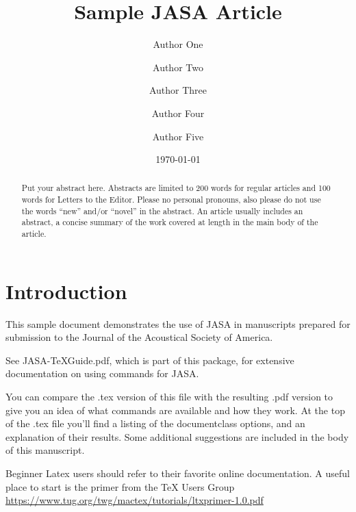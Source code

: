 \documentclass[reprint]{JASA}
\begin{document}
\title[JASA/Sample JASA Article]{Sample JASA Article}
\author{Author One}
\author{Author Two}
\author{Author Three}

\author{Author Four}
 
\author{Author Five}			


\date{\today} 

\begin{abstract}
Put your abstract here. Abstracts are limited to 200 words for
regular articles and 100 words for Letters to the Editor. Please no
personal pronouns, also please do not use the words ``new'' and/or
``novel'' in the abstract. An article usually includes an abstract, a
concise summary of the work covered at length in the main body of the
article.     
\end{abstract}


\maketitle


\section{\label{sec:1} Introduction}
This sample document demonstrates the use of JASA in manuscripts 
prepared for submission to the Journal of the Acoustical Society of America. 

See JASA-TeXGuide.pdf, which is part of this package, for extensive
documentation on using commands for JASA.

You can compare the .tex version of this file with the resulting .pdf
version to give you an idea of what  commands are available and how
they work. At the top of the .tex file you'll find a listing of the
documentclass options, and an explanation of their results.
Some additional suggestions are included in the body of this
manuscript.  

  Beginner Latex users should refer to their favorite online documentation. A 
  useful place to start is the primer from the TeX Users Group 
  \url{https://www.tug.org/twg/mactex/tutorials/ltxprimer-1.0.pdf}
\end{document}
